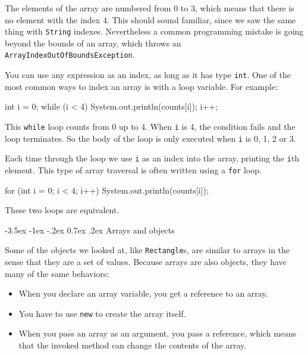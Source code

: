 \documentclass[12pt]{book}
\makeatletter
\theoremstyle{exercise}
\newcommand{\java}[1]{\verb"#1"}
\renewcommand{\section}{\@startsection{section}{1}{\z@}%
    {-3.5ex \@plus -1ex \@minus -.2ex}%
    {0.7ex \@plus.2ex}%
    {\normalfont\Large\bfseries}}
\newcommand{\java}[1]{\lstinline{#1}} %
\makeatother
\begin{document}

The elements of the array are numbered from 0 to 3, which means that there is no element with the index 4.
This should sound familiar, since we saw the same thing with \java{String} indexes.
Nevertheless a common programming mistake is going beyond the bounds of an array, which throws an \java{ArrayIndexOutOfBoundsException}.

You can use any expression as an index, as long as it has type \java{int}.
One of the most common ways to index an array is with a loop variable.
For example:

\begin{code}
    int i = 0;
    while (i < 4) {
        System.out.println(counts[i]);
        i++;
    }
\end{code}


This \java{while} loop counts from 0 up to 4.
When \java{i} is 4, the condition fails and the loop terminates.
So the body of the loop is only executed when \java{i} is 0, 1, 2 or 3.

Each time through the loop we use \java{i} as an index into the array, printing the \java{i}th element.
This type of array traversal is often written using a \java{for} loop.

\begin{code}
    for (int i = 0; i < 4; i++) {
        System.out.println(counts[i]);
    }
\end{code}

These two loops are equivalent.


\section{Arrays and objects}


Some of the objects we looked at, like \java{Rectangle}s, are similar to arrays in the sense that they are a set of values.
Because arrays are also objects, they have many of the same behaviors:

\begin{itemize}

\item When you declare an array variable, you get a reference to an array.

\item You have to use \java{new} to create the array itself.

\item When you pass an array as an argument, you pass a reference, which means that the invoked method can change the contents of the array.

\end{itemize}
\end{document}
